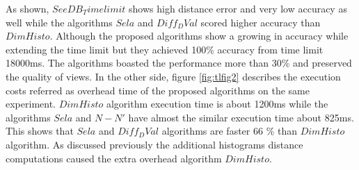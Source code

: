 As shown, $SeeDB_Timelimit$ shows high distance error and very low accuracy as well while the algorithms $Sela$ and $Diff_DVal$ scored higher accuracy than 
$DimHisto$. Although the proposed algorithms show a growing in accuracy while extending the time limit but they achieved 100\% accuracy from time limit 18000ms. The 
algorithms boasted the performance more than 30\% and preserved the quality of views. In the other side, figure \ref{fig:tlfig2} describes the execution costs referred as overhead time of 
the proposed algorithms on the same experiment. $DimHisto$ algorithm execution time is about 1200ms while the algorithms $Sela$ and $N-N'$ have almost the similar 
execution time about 825ms. 
This shows that $Sela$ and $Diff_DVal$ algorithms are faster 66 \% than $DimHisto$ algorithm. As discussed previously the additional histograms distance computations caused the extra overhead algorithm $DimHisto$. 

